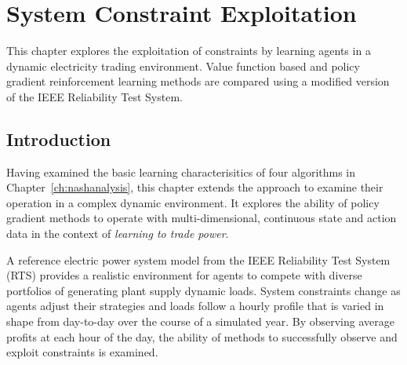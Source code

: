 \chapter{System Constraint Exploitation}
\label{ch:exploitation}
This chapter explores the exploitation of constraints by learning agents in a
dynamic electricity trading environment.  Value function based and policy
gradient reinforcement learning methods are compared using a modified version
of the IEEE Reliability Test System.

\section{Introduction}
Having examined the basic learning characterisitics of four algorithms in
Chapter~\ref{ch:nashanalysis}, this chapter extends the approach to examine
their operation in a complex dynamic environment.  It explores the ability of
policy gradient methods to operate with multi-dimensional, continuous state and
action data in the context of \textit{learning to trade power}.

A reference electric power system model from the IEEE Reliability Test System
(RTS) \cite{ieee79rts} provides a realistic environment for agents to compete
with diverse portfolios of generating plant supply dynamic loads.  System
constraints change as agents adjust their strategies and loads follow a hourly
profile that is varied in shape from day-to-day over the course of a simulated
year. By observing average profits at each hour of the day, the ability of
methods to successfully observe and exploit constraints is examined.


